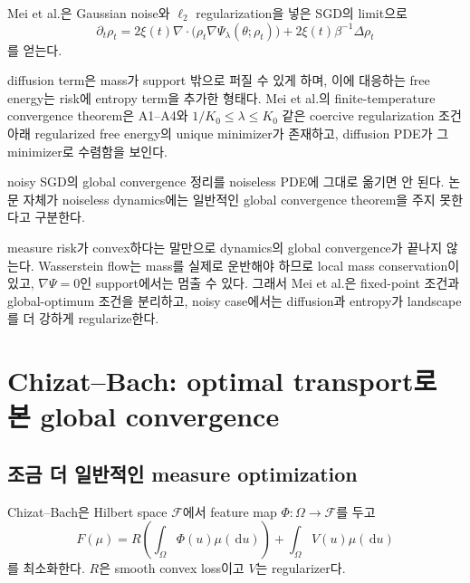 \documentclass[11pt,a4paper,oneside,openany]{memoir}
\newcommand{\grad}{\nabla}
\newcommand{\dd}{\,\mathrm{d}}
\newcommand{\diver}{\nabla\!\cdot}
\theoremstyle{definition}
\begin{document}
Mei et al.은 Gaussian noise와 $\ell_2$ regularization을 넣은 SGD의 limit으로
\begin{equation}
\partial_t\rho_t
=2\xi(t)\diver\bigl(\rho_t\grad\Psi_\lambda(\theta;\rho_t)\bigr)
+2\xi(t)\beta^{-1}\Delta\rho_t
\label{eq:diffusion-pde}
\end{equation}
를 얻는다.

diffusion term은 mass가 support 밖으로 퍼질 수 있게 하며, 이에 대응하는 free energy는 risk에
entropy term을 추가한 형태다. Mei et al.의 finite-temperature convergence theorem은 A1--A4와
$1/K_0\le \lambda\le K_0$ 같은 coercive regularization 조건 아래 regularized free energy의
unique minimizer가 존재하고, diffusion PDE가 그 minimizer로 수렴함을 보인다.

\begin{warningbox}
noisy SGD의 global convergence 정리를 noiseless PDE에 그대로 옮기면 안 된다.
논문 자체가 noiseless dynamics에는 일반적인 global convergence theorem을 주지 못한다고 구분한다.
\end{warningbox}

\begin{presentbox}
measure risk가 convex하다는 말만으로 dynamics의 global convergence가 끝나지 않는다.
Wasserstein flow는 mass를 실제로 운반해야 하므로 local mass conservation이 있고,
$\nabla\Psi=0$인 support에서는 멈출 수 있다. 그래서 Mei et al.은 fixed-point 조건과 global-optimum
조건을 분리하고, noisy case에서는 diffusion과 entropy가 landscape를 더 강하게 regularize한다.
\end{presentbox}

\chapter{Chizat--Bach: optimal transport로 본 global convergence}

\section{조금 더 일반적인 measure optimization}

Chizat--Bach은 Hilbert space $\mathcal F$에서 feature map $\Phi:\Omega\to\mathcal F$를 두고
\begin{equation}
  F(\mu)
  =R\left(\int_\Omega\Phi(u)\mu(\dd u)\right)
  +\int_\Omega V(u)\mu(\dd u)
\label{eq:chizat-functional}
\end{equation}
를 최소화한다. $R$은 smooth convex loss이고 $V$는 regularizer다.
\end{document}

